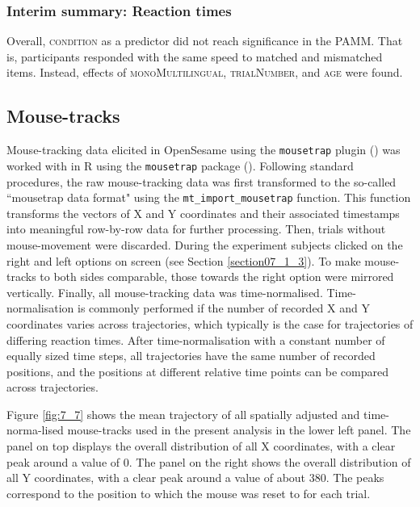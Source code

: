 \subsubsection{Interim summary: Reaction times}\label{section07_2_2_4}

Overall, \textsc{condition} as a predictor did not reach significance in the PAMM. That is, participants responded with the same speed to matched and mismatched items. Instead, effects of \textsc{monoMultilingual}, \textsc{trialNumber}, and \textsc{age} were found.

\subsection{Mouse-tracks}\label{section07_2_3}

Mouse-tracking data elicited in OpenSesame using the \texttt{mousetrap} plugin (\cite{Kieslich2017}) was worked with in R using the \texttt{mousetrap} package (\cite{Kieslich2019}). Following standard procedures, the raw mouse-tracking data was first transformed to the so-called ``mousetrap data format" using the \texttt{mt\_import\_mousetrap} function. This function transforms the vectors of X and Y coordinates and their associated timestamps into meaningful row-by-row data for further processing. Then, trials without mouse-movement were discarded. During the experiment subjects clicked on the right and left options on screen (see Section \ref{section07_1_3}). To make mouse-tracks to both sides comparable, those towards the right option were mirrored vertically. Finally, all mouse-tracking data was time-normalised. Time-normalisation is commonly performed if the number of recorded X and Y coordinates varies across trajectories, which typically is the case for trajectories of differing reaction times. After time-normalisation with a constant number of equally sized time steps, all trajectories have the same number of recorded positions, and the positions at different relative time points can be compared across trajectories. 

Figure \ref{fig:7_7} shows the mean trajectory of all spatially adjusted and time-norma-lised mouse-tracks used in the present analysis in the lower left panel. The panel on top displays the overall distribution of all X coordinates, with a clear peak around a value of $0$. The panel on the right shows the overall distribution of all Y coordinates, with a clear peak around a value of about $380$. The peaks correspond to the position to which the mouse was reset to for each trial.


